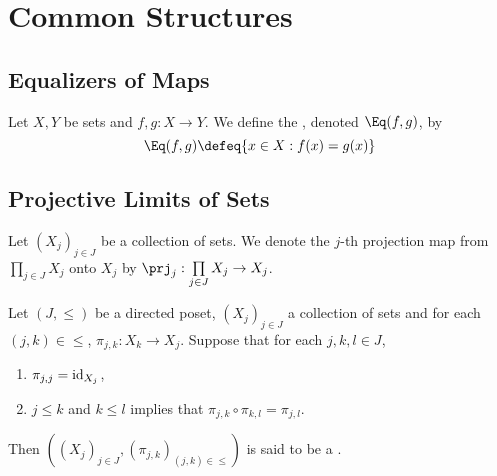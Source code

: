 \documentclass{book}
\begin{document}
	
	
	
	
	
	
	
\newpage
\section{Common Structures}

\subsection{Equalizers of Maps}

\begin{defn} 
	Let $X, Y$ be sets and $f,g:X \rightarrow Y$. We define the , denoted $\Eq(f,g)$, by 
	$$\Eq(f,g) \defeq \{x \in X: f(x) = g(x)\}$$
\end{defn}

\begin{ex}
	
\end{ex}	





























\subsection{Projective Limits of Sets}

\begin{note}
	Let $(X_j)_{j \in J}$ be a collection of sets. We denote the $j$-th projection map from $\prod\limits_{j \in J} X_j$ onto $X_j$ by $\prj_j: \prod\limits_{j \in J} X_j \rightarrow X_j$.
\end{note}
	
\begin{defn} 
	Let $(J, {\leq})$ be a directed poset, $(X_j)_{j \in J}$ a collection of sets and for each $(j,k) \in \leq$, $\pi_{j,k}:X_k \rightarrow X_j$. Suppose that for each $j,k,l \in J$, 
	\begin{enumerate}
		\item $\pi_{j,j} = \operatorname{id}_{X_j}$,
		\item $j \leq k$ and $k \leq l$ implies that $\pi_{j,k} \circ \pi_{k,l} = \pi_{j,l}$.
	\end{enumerate}
	Then $((X_j)_{j \in J}, (\pi_{j,k})_{(j,k) \in \leq})$ is said to be a .
\end{defn}
\end{document}
